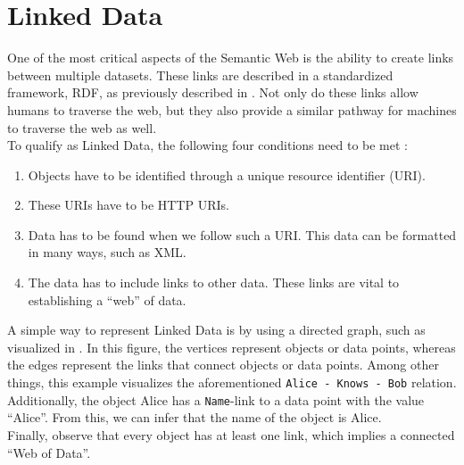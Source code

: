 \section{Linked Data}
One of the most critical aspects of the Semantic Web is the ability to create links between multiple datasets. These links are described in a standardized framework, RDF, as previously described in . Not only do these links allow humans to traverse the web, but they also provide a similar pathway for machines to traverse the web as well.\\

\noindent To qualify as Linked Data, the following four conditions need to be met \cite{bizer2011linked}:

\begin{enumerate}
    \item Objects have to be identified through a unique resource identifier (URI).
    \item These URIs have to be HTTP URIs.
    \item Data has to be found when we follow such a URI. This data can be formatted in many ways, such as XML.
    \item The data has to include links to other data. These links are vital to establishing a ``web'' of data.
\end{enumerate}

\noindent A simple way to represent Linked Data is by using a directed graph, such as visualized in . In this figure, the vertices represent objects or data points, whereas the edges represent the links that connect objects or data points. Among other things, this example visualizes the aforementioned \texttt{Alice - Knows - Bob} relation. Additionally, the object Alice has a \texttt{Name}-link to a data point with the value ``Alice''. From this, we can infer that the name of the object is Alice.\\

\noindent Finally, observe that every object has at least one link, which implies a connected ``Web of Data''.

